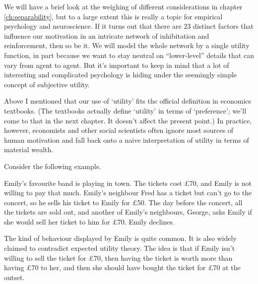 We will have a brief look at the weighing of different considerations
in chapter \ref{ch:separability}, but to a large extent this is really
a topic for empirical psychology and neuroscience. If it turns out
that there are 23 distinct factors that influence our motivation in an
intricate network of inhibitation and reinforcement, then so be it. We
will model the whole network by a single utility function, in part
because we want to stay neutral on ``lower-level'' details that can
vary from agent to agent.  But it's important to keep in mind that a
lot of interesting and complicated psychology is hiding under the
seemingly simple concept of subjective utility.



Above I mentioned that our use of `utility' fits the official
definition in economics textbooks. (The textbooks actually define
`utility' in terms of `preference'; we'll come to that in the next
chapter. It doesn't affect the present point.) In practice, however,
economists and other social scientists often ignore most sources of
human motivation and fall back onto a naive interpretation of utility
in terms of material wealth.

Consider the following example.

\begin{example}
  Emily's favourite band is playing in town. The tickets cost £70, and
  Emily is not willing to pay that much. Emily's neighbour Fred has a
  ticket but can't go to the concert, so he sells his ticket to Emily
  for £50. The day before the concert, all the tickets are sold out,
  and another of Emily's neighbours, George, asks Emily if she would
  sell her ticket to him for £70. Emily declines.
\end{example}

The kind of behaviour displayed by Emily is quite common. It is also
widely claimed to contradict expected utility theory. The idea is that
if Emily isn't willing to sell the ticket for £70, then having the
ticket is worth more than having £70 to her, and then she should have
bought the ticket for £70 at the outset.

